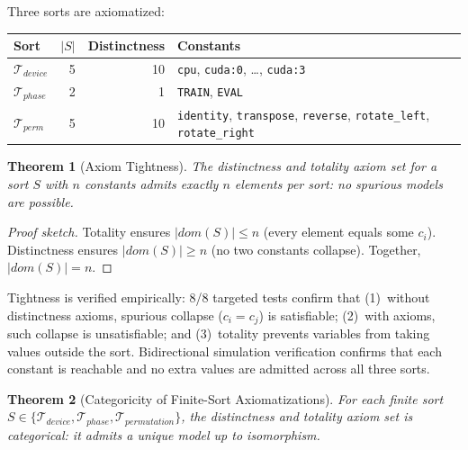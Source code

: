\documentclass[11pt]{article}
\newtheorem{theorem}{Theorem}
\begin{document}
Three sorts are axiomatized:
\begin{center}
\small
\begin{tabular}{@{}lrrl@{}}
\toprule
\textbf{Sort} & $|S|$ & \textbf{Distinctness} & \textbf{Constants} \\
\midrule
$\mathcal{T}_{\mathit{device}}$ & 5 & 10 &
  \texttt{cpu}, \texttt{cuda:0}, \ldots, \texttt{cuda:3} \\
$\mathcal{T}_{\mathit{phase}}$ & 2 & 1 &
  \texttt{TRAIN}, \texttt{EVAL} \\
$\mathcal{T}_{\mathit{perm}}$ & 5 & 10 &
  \texttt{identity}, \texttt{transpose}, \texttt{reverse},
  \texttt{rotate\_left}, \texttt{rotate\_right} \\
\bottomrule
\end{tabular}
\end{center}

\begin{theorem}[Axiom Tightness]\label{thm:tightness}
The distinctness and totality axiom set for a sort $S$ with $n$ constants
admits exactly $n$ elements per sort: no spurious models are possible.
\end{theorem}

\begin{proof}[Proof sketch]
Totality ensures $|\mathit{dom}(S)| \leq n$ (every element equals some
$c_i$).  Distinctness ensures $|\mathit{dom}(S)| \geq n$ (no two
constants collapse).  Together, $|\mathit{dom}(S)| = n$.
\end{proof}

\noindent
Tightness is verified empirically: 8/8 targeted tests confirm that
(1)~without distinctness axioms, spurious collapse ($c_i = c_j$) is
satisfiable; (2)~with axioms, such collapse is unsatisfiable; and
(3)~totality prevents variables from taking values outside the sort.
Bidirectional simulation verification confirms that each constant is
reachable and no extra values are admitted across all three sorts.

\begin{theorem}[Categoricity of Finite-Sort Axiomatizations]\label{thm:categoricity}
For each finite sort $S \in \{\mathcal{T}_{\mathit{device}},
\mathcal{T}_{\mathit{phase}}, \mathcal{T}_{\mathit{permutation}}\}$,
the distinctness and totality axiom set is \emph{categorical}: it
admits a unique model up to isomorphism.
\end{theorem}
\end{document}
